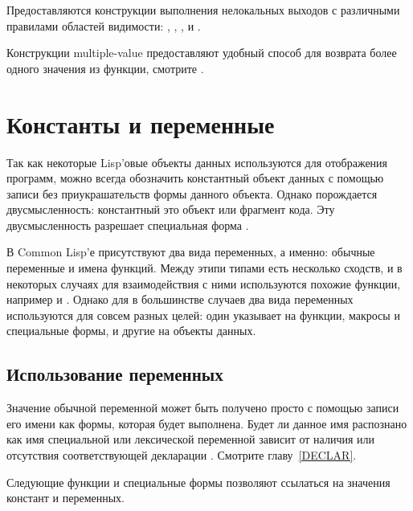 Предоставляются конструкции выполнения нелокальных выходов с различными 
правилами областей видимости: , , ,
 и .

Конструкции multiple-value предоставляют удобный способ для возврата более одного
значения из функции, смотрите .

\section{Константы и переменные}
\label{FUNCTION-NAME-SECTION}


Так как некоторые Lisp'овые объекты данных используются для отображения
программ, можно всегда обозначить константный объект данных с помощью записи
без приукрашательств формы данного объекта. Однако порождается двусмысленность:
константный это объект или фрагмент кода. Эту двусмысленность разрешает
специальная форма .

В Common Lisp'е присутствуют два вида переменных, а именно: обычные переменные и
имена функций. Между этипи типами есть несколько сходств, и в некоторых случаях
для взаимодействия с ними используются похожие функции, например  и
. 
Однако для в большинстве случаев два вида переменных используются для совсем
разных целей: один указывает на функции, макросы и специальные формы, и другие
на объекты данных.

\subsection{Использование переменных}

Значение обычной переменной может быть получено просто с помощью записи его
имени как формы, которая будет выполнена. Будет ли данное имя распознано как имя
специальной или лексической переменной зависит от наличия или отсутствия
соответствующей декларации . Смотрите главу~\ref{DECLAR}.

Следующие функции и специальные формы позволяют ссылаться на значения констант и
переменных.

